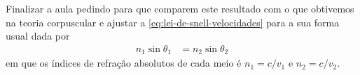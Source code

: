     Finalizar a aula pedindo para que comparem este resultado com o que obtivemos na teoria corpuscular e ajustar a \eqref{eq:lei-de-snell-velocidades} para a sua forma usual dada por
    \begin{align}
        n_1\sin\theta_1&=n_2\sin\theta_2
    \end{align}
    em que os índices de refração absolutos de cada meio é $n_1=c/v_1$ e $n_2=c/v_2$.
    


